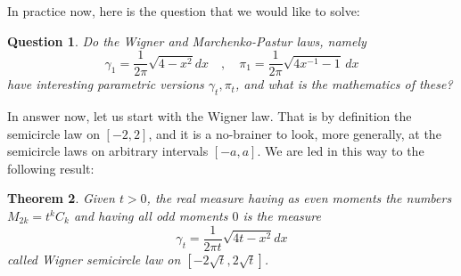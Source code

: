 \documentclass[12pt]{amsbook}
\newtheorem{theorem}{Theorem}[chapter]
\newtheorem{question}[theorem]{Question}
\begin{document}
\bigskip

In practice now, here is the question that we would like to solve:

\begin{question}
Do the Wigner and Marchenko-Pastur laws, namely
$$\gamma_1=\frac{1}{2\pi}\sqrt{4-x^2}dx\quad,\quad 
\pi_1=\frac{1}{2\pi}\sqrt{4x^{-1}-1}\,dx$$
have interesting parametric versions $\gamma_t,\pi_t$, and what is the mathematics of these?
\end{question}

In answer now, let us start with the Wigner law. That is by definition the semicircle law on $[-2,2]$, and it is a no-brainer to look, more generally, at the semicircle laws on arbitrary intervals $[-a,a]$. We are led in this way to the following result:

\begin{theorem}
Given $t>0$, the real measure having as even moments the numbers $M_{2k}=t^kC_k$ and having all odd moments $0$ is the measure
$$\gamma_t=\frac{1}{2\pi t}\sqrt{4t-x^2}dx$$
called Wigner semicircle law on $[-2\sqrt{t},2\sqrt{t}]$.
\end{theorem}
\end{document}
